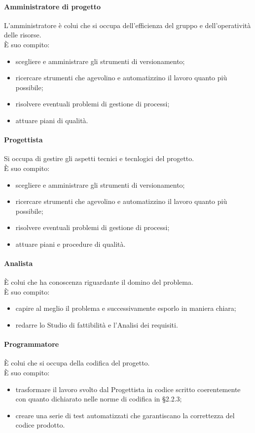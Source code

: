 \documentclass[11pt,a4paper]{article}
\begin{document}
{	\paragraph{Amministratore di progetto}
	L'amministratore è colui che si occupa dell'efficienza del gruppo e dell'operatività delle risorse.\\
	È suo compito:
	\begin{itemize}
		\item{scegliere e amministrare gli strumenti di versionamento;}
		\item{ricercare strumenti che agevolino e automatizzino il lavoro quanto più possibile;}
		\item{risolvere eventuali problemi di gestione di processi;}
		\item{attuare piani  di qualità.}
	\end{itemize}
	\paragraph{Progettista}
	Si occupa di gestire gli aspetti tecnici e tecnlogici del progetto.\\
	È suo compito:
	\begin{itemize}
		\item{scegliere e amministrare gli strumenti di versionamento;}
		\item{ricercare strumenti che agevolino e automatizzino il lavoro quanto più possibile;}
		\item{risolvere eventuali problemi di gestione di processi;}
		\item{attuare piani e procedure di qualità.}
	\end{itemize}
	\paragraph{Analista}
	È colui che ha conoscenza riguardante il domino del problema.\\
	È suo compito:
	\begin{itemize}
		\item{capire al meglio il problema e successivamente esporlo in maniera chiara;}
		\item{redarre lo Studio di fattibilità e l'Analisi dei requisiti.}
	\end{itemize}
	\paragraph{Programmatore}
	È colui che si occupa della codifica del progetto.\\
	È suo compito:
	\begin{itemize}
		\item{trasformare il lavoro svolto dal Progettista in codice scritto coerentemente con quanto dichiarato nelle norme di codifica in \S2.2.3;}
		\item{creare una serie di test automatizzati che garantiscano la correttezza del codice prodotto.}
	\end{itemize}
}
\end{document}
